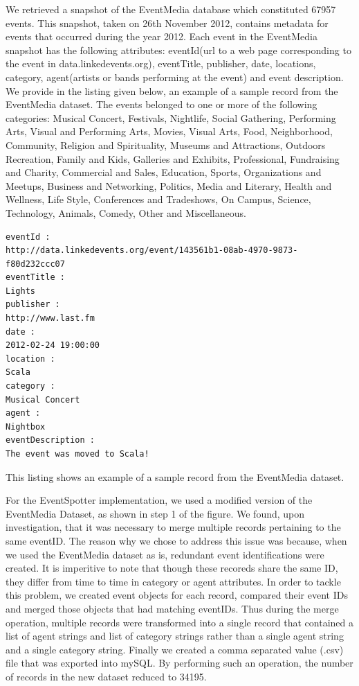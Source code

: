 \documentclass[a4paper,11pt]{report}
\begin{document}
We retrieved a snapshot of the EventMedia database which constituted 67957 events. This snapshot, taken on 26th November 2012, contains metadata for events that occurred during the year 2012. Each event in the EventMedia snapshot has the following attributes: eventId(url to a web page corresponding to the event in data.linkedevents.org), eventTitle, publisher, date, locations, category, agent(artists or bands performing at the event) and event description. We provide in the listing given below, an example of a sample record from the EventMedia dataset. The events belonged to one or more of the following categories: Musical Concert, Festivals, Nightlife, Social Gathering, Performing Arts, Visual and Performing Arts, Movies, Visual Arts, Food, Neighborhood, Community, Religion and Spirituality, Museums and Attractions, Outdoors Recreation, Family and Kids, Galleries and Exhibits, Professional, Fundraising and Charity, Commercial and Sales, Education, Sports, Organizations and Meetups, Business and Networking, Politics, Media and Literary, Health and Wellness, Life Style, Conferences and Tradeshows, On Campus, Science, Technology, Animals, Comedy, Other and Miscellaneous. \newline 

\begin{lstlisting}
eventId : 
http://data.linkedevents.org/event/143561b1-08ab-4970-9873-f80d232ccc07
eventTitle : 
Lights
publisher : 
http://www.last.fm
date : 
2012-02-24 19:00:00
location : 
Scala
category : 
Musical Concert
agent : 
Nightbox
eventDescription : 
The event was moved to Scala!
\end{lstlisting}
This listing shows an example of a sample record from the EventMedia dataset.

For the EventSpotter implementation, we used a modified version of the EventMedia Dataset, as shown in step 1 of the figure. We found, upon investigation, that it was necessary to merge multiple records pertaining to the same eventID. The reason why we chose to address this issue was because, when we used the EventMedia dataset as is, redundant event identifications were created. It is imperitive to note that though these recoreds share the same ID, they differ from time to time in category or agent attributes. In order to tackle this problem, we created event objects for each record, compared their event IDs and merged those objects that had matching eventIDs. Thus during the merge operation, multiple records were transformed into a single record that contained a list of agent strings and list of category strings rather than a single agent string and a single category string. Finally we created a comma separated value (.csv) file that was exported into mySQL. By performing such an operation, the number of records in the new dataset reduced to 34195.   
 
\end{document}
